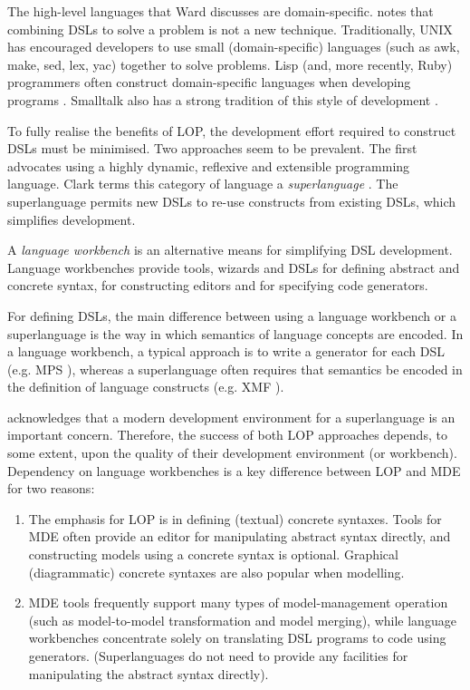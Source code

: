The high-level languages that Ward discusses are domain-specific. \cite{fowler05language} notes that combining DSLs to solve a problem is not a new technique. Traditionally, UNIX has encouraged developers to use small (domain-specific) languages (such as awk, make, sed, lex, yac) together to solve problems. Lisp (and, more recently, Ruby) programmers often construct domain-specific languages when developing programs \cite{graham93lisp}. Smalltalk also has a strong tradition of this style of development \cite{fowler05language}.

To fully realise the benefits of LOP, the development effort required to construct DSLs must be minimised. Two approaches seem to be prevalent. The first advocates using a highly dynamic, reflexive and extensible programming language. Clark terms this category of language a \textit{superlanguage} \cite{clark08superlanguages}. The superlanguage permits new DSLs to re-use constructs from existing DSLs, which simplifies development.

A \textit{language workbench} \cite{fowler05language} is an alternative means for simplifying DSL development. Language workbenches provide tools, wizards and DSLs for defining abstract and concrete syntax, for constructing editors and for specifying code generators.

For defining DSLs, the main difference between using a language workbench or a superlanguage is the way in which semantics of language concepts are encoded. In a language workbench, a typical approach is to write a generator for each DSL (e.g. MPS \cite{mps}), whereas a superlanguage often requires that semantics be encoded in the definition of language constructs (e.g. XMF \cite{xmf}).

\cite{clark08superlanguages} acknowledges that a modern development environment for a superlanguage is an important concern. Therefore, the success of both LOP approaches depends, to some extent, upon the quality of their development environment (or workbench). Dependency on language workbenches is a key difference between LOP and MDE for two reasons:

\begin{enumerate}
 \item The emphasis for LOP is in defining (textual) concrete syntaxes. Tools for MDE often provide an editor for manipulating abstract syntax directly, and constructing models using a concrete syntax is optional. Graphical (diagrammatic) concrete syntaxes are also popular when modelling.
 \item MDE tools frequently support many types of model-management operation (such as model-to-model transformation and model merging), while language workbenches concentrate solely on translating DSL programs to code using generators. (Superlanguages do not need to provide any facilities for manipulating the abstract syntax directly).
\end{enumerate}

